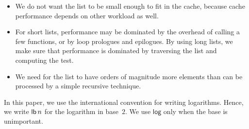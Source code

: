 \begin{itemize}
\item We do not want the list to be small enough to fit in the cache,
  because cache performance depends on other workload as well.
\item For short lists, performance may be dominated by the overhead of
  calling a few functions, or by loop prologues and epilogues.  By
  using long lists, we make sure that performance is dominated by
  traversing the list and computing the test.
\item We need for the list to have orders of magnitude more elements
  than can be processed by a simple recursive technique.
\end{itemize}

In this paper, we use the international convention for writing
logarithms.  Hence, we write $\mathsf{lb}\thinspace n$ for the
logarithm in base~$2$.  We use $\mathsf{log}$ only when the base is
unimportant.

